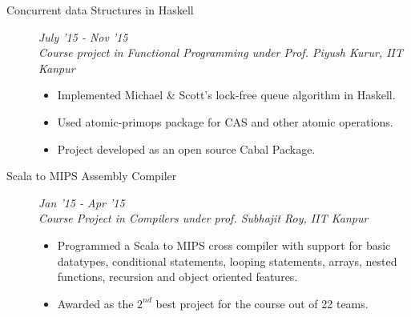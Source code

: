 \documentclass[9pt]{article}
\newenvironment{changemargin}[2]{%
  \begin{list}{}{%
    \setlength{\topsep}{0pt}%
    \setlength{\leftmargin}{#1}%
    \setlength{\rightmargin}{#2}%
    \setlength{\listparindent}{\parindent}%
    \setlength{\itemindent}{\parindent}%
    \setlength{\parsep}{\parskip}%
  }%
  \item[]}{\end{list}
}
\newenvironment{body} {
	\vspace*{-16pt}
	\begin{changemargin}{-0.6in}{-0.65in}
  }	
	{\end{changemargin}
}
\begin{document}
\begin{body}
\begin{description}
	  \item[\normalsize{Concurrent data Structures in Haskell}] \hfill  \textit{July '15 - Nov '15} \\
	  \textit{Course project in Functional Programming under Prof. Piyush Kurur, IIT Kanpur}
	  \begin{itemize}
	   \item Implemented Michael \& Scott's lock-free queue algorithm in Haskell.
	   \item Used atomic-primops package for CAS and other atomic operations.
	   \item Project developed as an open source Cabal Package.
	  \end{itemize}
	

 	\item[\normalsize{Scala to MIPS Assembly Compiler}] \hfill \textit{Jan '15 - Apr '15} \\
 	\textit{Course Project in Compilers under prof. Subhajit Roy, IIT Kanpur}
 	\begin{itemize}
 	 \item Programmed a Scala to MIPS cross compiler with support for basic datatypes, conditional statements,
 looping statements, arrays, nested functions, recursion and object oriented features.
 	 \item Awarded as the $2^{nd}$ best project for the course out of 22 teams.
 	\end{itemize}
 	

\end{description}
\end{body}
\end{document}
